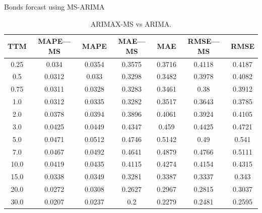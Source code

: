 \documentclass[aspectratio=169]{beamer}
\begin{document}
    \begin{frame}{Bonds forcast using MS-ARIMA}
        \begin{table}[H]
            \begin{center}
                \begin{tabular}{|c|c|c|c|c|c|c|}
                    \hline
                    TTM    & MAPE---MS  & MAPE      & MAE---MS    & MAE       & RMSE---MS    & RMSE  \\ \hline
                    0.25   &0.034       & 0.0354    & 0.3575      & 0.3716    &0.4118        &0.4187 \\ \hline
                    0.5    &0.0312      & 0.033     & 0.3298      & 0.3482    &0.3978        &0.4082 \\ \hline
                    0.75   &0.0311      & 0.0328    & 0.3283      & 0.3461    &0.38          &0.3912   \\ \hline
                    1.0    &0.0312      & 0.0335    & 0.3282      & 0.3517    &0.3643        &0.3785 \\ \hline
                    2.0    &0.0378      & 0.0394    & 0.3896      & 0.4061    &0.3924        &0.4105 \\ \hline
                    3.0    &0.0425      & 0.0449    & 0.4347      & 0.459     &0.4425        &0.4721 \\ \hline
                    5.0    &0.0471      & 0.0512    & 0.4746      & 0.5142    &0.49          &0.541   \\ \hline
                    7.0    &0.0467      & 0.0492    & 0.4641      & 0.4879    &0.4766        &0.5111 \\ \hline
                    10.0   &0.0419      & 0.0435    & 0.4115      & 0.4274    &0.4154        &0.4315 \\ \hline
                    15.0   &0.0338      & 0.0349    & 0.3281      & 0.3387    &0.3337        &0.343 \\ \hline
                    20.0   &0.0272      & 0.0308    & 0.2627      & 0.2967    &0.2815        &0.3037 \\ \hline
                    30.0   &0.0207      & 0.0237    & 0.2         & 0.2279    &0.2481        &0.2595 \\ \hline
                \end{tabular}
                \caption{ARIMAX-MS vs ARIMA.}
            \end{center}
        \end{table} 
    \end{frame}
\end{document}
